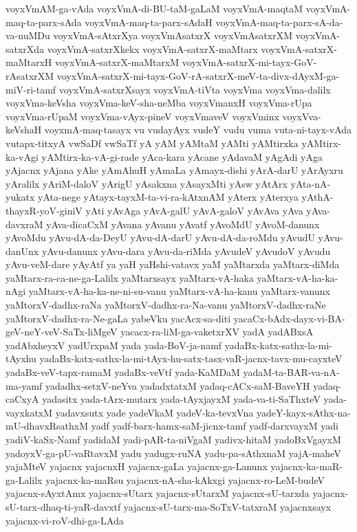 {voyxVmAM-ga-vAda
voyxVmA-di-BU-taM-gaLaM
voyxVmA-maqtaM
voyxVmA-maq-ta-parx-sAda
voyxVmA-maq-ta-parx-sAdaH
voyxVmA-maq-ta-parx-sA-da-va-nuMDu
voyxVmA-sAtxrXya
voyxVmAsatxrX
voyxVmAsatxrXM
voyxVmA-satxrXda
voyxVmA-satxrXkekx
voyxVmA-satxrX-maMtarx
voyxVmA-satxrX-maMtarxH
voyxVmA-satxrX-maMtarxM
voyxVmA-satxrX-mi-tayx-GoV-rAsatxrXM
voyxVmA-satxrX-mi-tayx-GoV-rA-satxrX-meV-ta-divx-dAyxM-ga-miV-ri-tamf
voyxVmA-satxrXsayx
voyxVmA-tiVta
voyxVma
voyxVma-dalilx
voyxVma-keVsha
voyxVma-keV-sha-neMba
voyxVmanxH
voyxVma-rUpa
voyxVma-rUpaM
voyxVma-vAyx-pineV
voyxVmaveV
voyxVminx
voyxVva-keVshaH
voyxmA-maq-tasayx
vu
vudayAyx
vudeY
vudu
vuma
vuta-ni-tayx-vAda
vutapx-titxyA
vwSaDf
vwSaTf
yA
yAM
yAMtaM
yAMti
yAMtirxka
yAMtirx-ka-vAgi
yAMtirx-ka-vA-gi-rade
yAca-kara
yAcane
yAdavaM
yAgAdi
yAga
yAjacnx
yAjana
yAke
yAmAhuH
yAmaLa
yAmayx-dishi
yArA-darU
yArAyxru
yAralilx
yAriM-daloV
yArigU
yAsakxna
yAsayxMti
yAsw
yAtArx
yAta-nA-yukatx
yAta-nege
yAtayx-tayxM-ta-vi-ra-kAtxnAM
yAterx
yAterxya
yAthA-thayxR-yoV-giniV
yAti
yAvAga
yAvA-galU
yAvA-galoV
yAvAva
yAva
yAva-davxraM
yAva-dicaCxM
yAvana
yAvanu
yAvatf
yAvoMdU
yAvoM-danunx
yAvoMdu
yAvu-dA-da-DeyU
yAvu-dA-darU
yAvu-dA-da-roMdu
yAvudU
yAvu-danUnx
yAvu-danunx
yAvu-dara
yAvu-da-riMda
yAvudeV
yAvudoV
yAvudu
yAvu-veM-dare
yAyAtf
ya
yaH
yaHshi-vatavx
yaM
yaMtarxda
yaMtarx-diMda
yaMtarx-ra-ca-ne-ga-Lalilx
yaMtarxsayx
yaMtarx-vA-haka
yaMtarx-vA-ha-ka-nAgi
yaMtarx-vA-ha-ka-ne-ni-su-vanu
yaMtarx-vA-ha-kanu
yaMtarx-vanunx
yaMtorxV-dadhx-raNa
yaMtorxV-dadhx-ra-Na-vanu
yaMtorxV-dadhx-raNe
yaMtorxV-dadhx-ra-Ne-gaLa
yabeVku
yacAcx-sa-diti
yacaCx-bAdx-dayx-vi-BA-geV-neY-veV-SaTx-liMgeV
yacacx-ra-liM-ga-vaketxrXV
yadA
yadABxsA
yadAbxheyxV
yadUrxpaM
yada
yada-BoV-ja-namf
yadaBx-katx-sathx-la-mi-tAyxhu
yadaBx-katx-sathx-la-mi-tAyx-hu-satx-tasx-vaR-jacnx-tavx-mu-cayxteV
yadaBx-veV-tapx-ramaM
yadaBx-veVtf
yada-KaMDaM
yadaM-ta-BAR-va-nA-ma-yamf
yadadhx-setxV-neYva
yadadxtatxM
yadaq-cACx-saM-BaveYH
yadaq-caCxyA
yadasitx
yada-tArx-mutarx
yada-tAyxjayxM
yada-va-ti-SaThxteV
yada-vayxkatxM
yadavxsutx
yade
yadeVkaM
yadeV-ka-tevxVna
yadeY-kayx-sAthx-na-mU-dhavxRsathxM
yadf
yadf-barx-hamx-saM-jicnx-tamf
yadf-darxvayxM
yadi
yadiV-kaSx-Namf
yadidaM
yadi-pAR-ta-niVgaM
yadivx-hitaM
yadoBxVgayxM
yadoyxV-ga-pU-vaRtavxM
yadu
yadugx-ruNA
yadu-pa-sAthxnaM
yajA-maheV
yajaMteV
yajacnx
yajacnxH
yajacnx-gaLa
yajacnx-ga-Lanunx
yajacnx-ka-maR-ga-Lalilx
yajacnx-ka-maRsu
yajacnx-nA-sha-kAkxgi
yajacnx-ro-LeM-budeV
yajacnx-sAyxtAmx
yajacnx-sUtarx
yajacnx-sUtarxM
yajacnx-sU-tarxda
yajacnx-sU-tarx-dhaq-ti-yaR-davxtf
yajacnx-sU-tarx-ma-SoTxV-tatxraM
yajacnxsayx
yajacnx-vi-roV-dhi-ga-LAda
}
